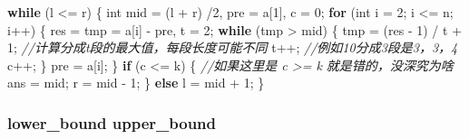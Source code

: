 \documentclass[
]{article}
\newenvironment{Shaded}{}{}
\newcommand{\CommentTok}[1]{\textcolor[rgb]{0.38,0.63,0.69}{\textit{#1}}}
\newcommand{\ControlFlowTok}[1]{\textcolor[rgb]{0.00,0.44,0.13}{\textbf{#1}}}
\newcommand{\DataTypeTok}[1]{\textcolor[rgb]{0.56,0.13,0.00}{#1}}
\newcommand{\DecValTok}[1]{\textcolor[rgb]{0.25,0.63,0.44}{#1}}
\newcommand{\NormalTok}[1]{#1}
\newcommand{\OperatorTok}[1]{\textcolor[rgb]{0.40,0.40,0.40}{#1}}
\begin{document}
\begin{Shaded}
\begin{Highlighting}[]
  \ControlFlowTok{while} \OperatorTok{(}\NormalTok{l }\OperatorTok{\textless{}=}\NormalTok{ r}\OperatorTok{)} \OperatorTok{\{}
        \DataTypeTok{int}\NormalTok{ mid }\OperatorTok{=} \OperatorTok{(}\NormalTok{l }\OperatorTok{+}\NormalTok{ r}\OperatorTok{)} \OperatorTok{/}\DecValTok{2}\OperatorTok{,}\NormalTok{ pre }\OperatorTok{=}\NormalTok{ a}\OperatorTok{[}\DecValTok{1}\OperatorTok{],}\NormalTok{ c }\OperatorTok{=} \DecValTok{0}\OperatorTok{;}
        \ControlFlowTok{for} \OperatorTok{(}\DataTypeTok{int}\NormalTok{ i }\OperatorTok{=} \DecValTok{2}\OperatorTok{;}\NormalTok{ i }\OperatorTok{\textless{}=}\NormalTok{ n}\OperatorTok{;}\NormalTok{ i}\OperatorTok{++)} \OperatorTok{\{}
\NormalTok{            res }\OperatorTok{=}\NormalTok{ tmp }\OperatorTok{=}\NormalTok{ a}\OperatorTok{[}\NormalTok{i}\OperatorTok{]} \OperatorTok{{-}}\NormalTok{ pre}\OperatorTok{,}\NormalTok{ t }\OperatorTok{=} \DecValTok{2}\OperatorTok{;}
            \ControlFlowTok{while} \OperatorTok{(}\NormalTok{tmp }\OperatorTok{\textgreater{}}\NormalTok{ mid}\OperatorTok{)} \OperatorTok{\{}
\NormalTok{                tmp }\OperatorTok{=} \OperatorTok{(}\NormalTok{res }\OperatorTok{{-}} \DecValTok{1}\OperatorTok{)} \OperatorTok{/}\NormalTok{ t }\OperatorTok{+} \DecValTok{1}\OperatorTok{;} \CommentTok{//计算分成t段的最大值，每段长度可能不同}
\NormalTok{                t}\OperatorTok{++;}                     \CommentTok{//例如10分成3段是3，3，4}
\NormalTok{                c}\OperatorTok{++;}
            \OperatorTok{\}}
\NormalTok{            pre }\OperatorTok{=}\NormalTok{ a}\OperatorTok{[}\NormalTok{i}\OperatorTok{];}
        \OperatorTok{\}}
        \ControlFlowTok{if} \OperatorTok{(}\NormalTok{c }\OperatorTok{\textless{}=}\NormalTok{ k}\OperatorTok{)} \OperatorTok{\{} \CommentTok{//如果这里是 c \textgreater{}= k 就是错的，没深究为啥}
\NormalTok{            ans }\OperatorTok{=}\NormalTok{ mid}\OperatorTok{;}
\NormalTok{            r }\OperatorTok{=}\NormalTok{ mid }\OperatorTok{{-}} \DecValTok{1}\OperatorTok{;}
        \OperatorTok{\}}
        \ControlFlowTok{else}\NormalTok{ l }\OperatorTok{=}\NormalTok{ mid }\OperatorTok{+} \DecValTok{1}\OperatorTok{;}
    \OperatorTok{\}}
\end{Highlighting}
\end{Shaded}

\hypertarget{lowerbound-upperbound}{%
\subsubsection{lower\_bound upper\_bound}\label{lowerbound-upperbound}}
\end{document}
